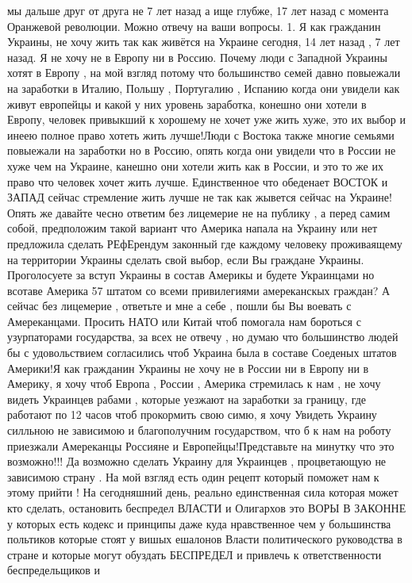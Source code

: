 \begin{itemize}
мы дальше друг от друга не 7 лет назад а ище глубже, 17 лет назад с момента
Оранжевой революции. Можно отвечу на ваши вопросы.
1. Я как гражданин Украины, не хочу жить так как живётся на Украине сегодня, 14
лет назад , 7 лет назад. Я не хочу не в Европу ни в Россию. Почему люди с
Западной Украины хотят в Европу , на мой взгляд потому что большинство семей
давно повыежали на заработки в Италию, Польшу , Португалию , Испанию когда они
увидели как живут европейцы и какой у них уровень заработка, конешно они хотели
в Европу, человек привыкший к хорошему не хочет уже жить хуже, это их выбор и
инеею полное право хотеть жить лучше!Люди с Востока также многие семьями
повыежали на заработки но в Россию, опять когда они увидели что в России не
хуже чем на Украине, канешно они хотели жить как в России, и это то же их право
что человек хочет жить лучше.
Единственное что обеденает ВОСТОК и ЗАПАД сейчас стремление жить лучше не так
как жывется сейчас на Украине! Опять же давайте чесно ответим без лицемерие не
на публику , а перед самим собой, предположим такой вариант что Америка напала
на Украину или нет предложила сделать РЕфЕрендум законный где каждому человеку
проживаящему на территории Украины сделать свой выбор, если Вы граждане
Украины. Проголосуете за вступ Украины в состав Америкы и будете Украинцами но
всотаве Америка 57 штатом со всеми привилегиями амереканскых граждан? А сейчас
без лицемерие , ответьте и мне а себе , пошли бы Вы воевать с Амереканцами.
Просить НАТО или Китай чтоб помогала нам бороться с узурпаторами государства,
за всех не отвечу , но думаю что большинство людей бы с удовольствием
согласились чтоб Украина была в составе Соеденых штатов Америки!Я как гражданин
Украины не хочу не в России ни в Европу ни в Америку, я хочу чтоб Европа ,
России , Америка стремилась к нам , не хочу видеть Украинцев рабами , которые
уезжают на заработки за границу, где работают по 12 часов чтоб прокормить свою
симю, я хочу Увидеть Украину силльною не зависимою и благополучним
государством, что б к нам на роботу приезжали Амереканцы Россияне и
Европейцы!Представьте на минутку что это возможно!!! Да возможно сделать
Украину для Украинцев , процветающую не зависимою страну . 
На мой взгляд есть один рецепт который поможет нам к этому прийти ! На
сегодняшний день, реально единственная сила которая может кто сделать,
остановить беспредел ВЛАСТИ и Олигархов это ВОРЫ В ЗАКОННЕ у которых есть
кодекс и принципы даже куда нравственное чем у большинства польтиков которые
стоят у вишых ешалонов Власти политического руководства в стране и которые
могут обуздать БЕСПРЕДЕЛ и привлечь к ответственности беспредельщиков и

\end{itemize}
